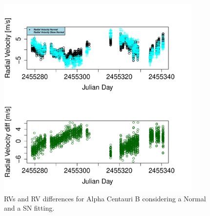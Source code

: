 \documentclass[11pt, oneside]{article}
\begin{document}

\begin{figure}[htbp]
   \centering
\includegraphics[height = 4in]{HD12862_[2]RadialVelocityDifferences.pdf} 
   \caption{RVs and RV differences for Alpha Centauri B considering a Normal and a SN fitting.}
   \label{fig:alphacent:diff:RV}
\end{figure}
\end{document}
